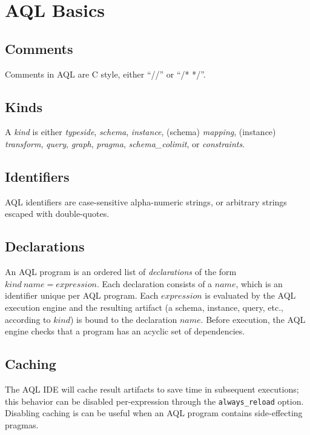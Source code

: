 \documentclass[10pt]{book}
\begin{document}
\chapter{AQL Basics}

\section{Comments}

Comments in AQL are C style, either ``//'' or ``/* */''.  

\section{Kinds}

A {\it kind} is either {\it typeside}, {\it schema},  {\it instance}, (schema) {\it  mapping}, (instance) {\it transform}, {\it query}, {\it graph},  {\it pragma}, {\it schema\_colimit}, or {\it constraints}. 

\section{Identifiers}

AQL identifiers are case-sensitive alpha-numeric strings, or arbitrary strings escaped with double-quotes.

\section{Declarations}

An AQL program is an ordered list of {\it declarations} of the form $kind \ name = expression$.  Each declaration consists of a $name$, which is an   identifier unique per AQL program. Each $expression$ is evaluated by the AQL execution engine and the resulting artifact (a schema, instance, query, etc., according to $kind$) is bound to the declaration $name$.  Before execution, the AQL engine checks that a program has an acyclic set of dependencies.

\section{Caching}

The AQL IDE will cache result artifacts to save time in subsequent executions; this behavior can be disabled per-expression through the {\tt always\_reload} option.  Disabling caching is can be useful when an AQL program contains side-effecting pragmas.
\end{document}
